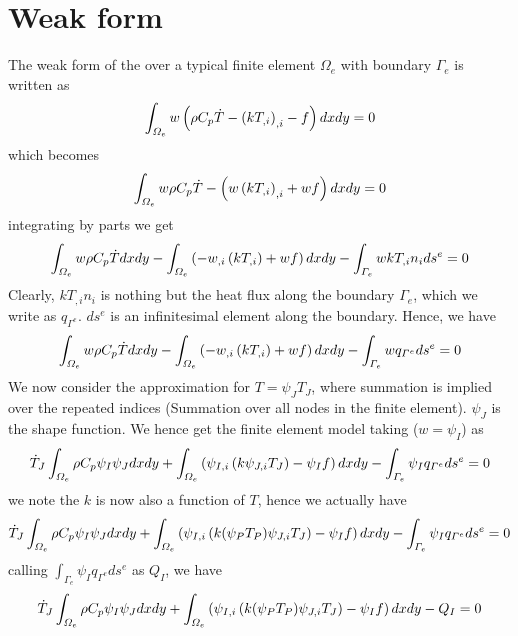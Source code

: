 \documentclass[preprint,12pt]{elsarticle}
\numberwithin{equation}{section}
\begin{document}
\section{Weak form}
The weak form of the  over a typical finite element $\Omega_e$ with boundary $\Gamma_e$ is written as 
\begin{equation}
	\int_{\Omega_e} w \left(\rho C_p \dot{T}- \left( k T_{,i} \right)_{,i} - f \right) dx dy = 0\label{eq:wf1}
\end{equation}
which becomes
\begin{equation}
	\int_{\Omega_e} w \rho C_p \dot{T}- \left( w \left( k T_{,i} \right)_{,i} +  w f \right) dx dy = 0 \label{eq:wf2}
\end{equation}
integrating by parts we get
\begin{equation}
	\int_{\Omega_e} w \rho C_p \dot{T} dx dy - \int_{\Omega_e} \left( -w_{,i} \left( k T_{,i} \right) +  w f \right)  dx dy -\int_{\Gamma_e} w kT_{,i}n_{i}ds^e = 0 \label{eq:wf3}
\end{equation}
Clearly, $k T_{,i}n_i$ is nothing but the heat flux along the boundary $\Gamma_e$, which we write as $q_{\Gamma^e}$. $ds^e$ is an infinitesimal element along the boundary. Hence, we have
\begin{equation}
	\int_{\Omega_e} w \rho C_p \dot{T} dx dy - \int_{\Omega_e} \left( -w_{,i} \left( k T_{,i} \right) +  w f \right)  dx dy -\int_{\Gamma_e} w q_{\Gamma^e}ds^e = 0 \label{eq:wf4}
\end{equation}
We now consider the approximation for $T = \psi_J T_J$, where summation is implied over the repeated indices (Summation over all nodes in the finite element). $\psi_J$ is the shape function. We hence get the finite element model taking ($w=\psi_I$) as
\begin{equation}
\dot{T}_J	\int_{\Omega_e}\rho C_p \psi_I  \psi_J  dx dy + \int_{\Omega_e} \left( \psi_{I,i} \left( k \psi_{J,i}T_J \right) - \psi_I f \right)  dx dy -\int_{\Gamma_e} \psi_I q_{\Gamma^e}ds^e = 0 \label{eq:wf5}
\end{equation}
we note the $k$ is now also a function of $T$, hence we actually have 
\begin{equation}
	\dot{T}_J	\int_{\Omega_e}\rho C_p \psi_I  \psi_J  dx dy + \int_{\Omega_e} \left( \psi_{I,i} \left( k (\psi_PT_P) \psi_{J,i}T_J \right) - \psi_I f \right)  dx dy -\int_{\Gamma_e} \psi_I q_{\Gamma^e}ds^e = 0 \label{eq:wf6}
\end{equation}
calling $\int_{\Gamma_e} \psi_I q_{\Gamma^e}ds^e$ as $Q_I$, we have
\begin{equation}
	\dot{T}_J	\int_{\Omega_e}\rho C_p \psi_I  \psi_J  dx dy + \int_{\Omega_e} \left( \psi_{I,i} \left( k (\psi_PT_P) \psi_{J,i}T_J \right) - \psi_I f \right)  dx dy -Q_I = 0 \label{eq:wf7}
\end{equation}
\end{document}
